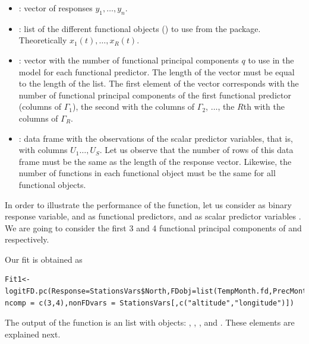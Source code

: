 \begin{itemize} 
\item {}: vector of responses $y_{1},\ldots ,y_{n}.$ 
\item {}: list of the different functional objects () to use from the  package. Theoretically $x_1(t),\ldots,x_R(t).$
\item {}: vector with the number of functional principal components $q$ to use in the model for each functional predictor. The length of the vector must be equal to the length of the  list. The first element of the vector corresponds with the number of functional principal components of the first functional predictor (columns of $\Gamma_1$), the second with the columns of $\Gamma_2$, $\ldots$, the $R$th with the columns of $\Gamma_R.$
\item {}: data frame with the observations of the scalar predictor variables, that is, with columns $U_1\ldots,U_S.$ Let us observe that the number of rows of this data frame must be the same as the length of the response vector. Likewise, the number of functions in each functional object must be the same for all functional objects.
\end{itemize} 

In order to illustrate the performance of the function, let us consider  as binary response variable,  and  as functional predictors, and as scalar predictor variables . We are going to consider the first 3 and 4 functional principal components of  and  respectively.

Our fit is obtained as

\begin{verbatim}
Fit1<-logitFD.pc(Response=StationsVars$North,FDobj=list(TempMonth.fd,PrecMonth.fd),
ncomp = c(3,4),nonFDvars = StationsVars[,c("altitude","longitude")])
\end{verbatim}

The output of the function is an  list with objects: , , ,  and . These elements are explained next.

